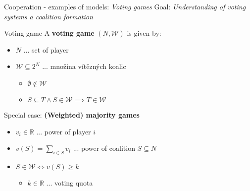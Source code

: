 \documentclass{beamer}
\begin{document}
\begin{frame}{Cooperation - examples of models: \textit{Voting games}}
    Goal: \textit{Understanding of voting systems a coalition formation}
    \pause
    \begin{block}{Voting game}
        A \textbf{voting game} $(N,\mathcal{W})$ is given by:
    \begin{itemize}
        \pause
        \item $N$ ... set of player
        \pause	
         \item $\mathcal{W} \subseteq 2^N$ ... množina vítězných koalic
        \begin{itemize}
            \pause
            \item $\emptyset \notin \mathcal{W}$
            \item $S \subseteq T \wedge S \in \mathcal{W} \implies T \in \mathcal{W}$
        \end{itemize}
    \end{itemize}
    \end{block}
    \pause
    Special case: \textbf{(Weighted) majority games}
    \begin{itemize}
        \pause
        \item $v_i \in \mathbb{R}$ ... power of player $i$
        \pause
        \item $v(S) = \sum_{i \in S}v_i$ ... power of coalition $S \subseteq N$
        \pause
        \item $S \in \mathcal{W} \iff v(S) \geq k$
        \begin{itemize}
            \item $k \in \mathbb{R}$ ... voting quota
        \end{itemize} 
    \end{itemize}
\end{frame}


\end{document}
